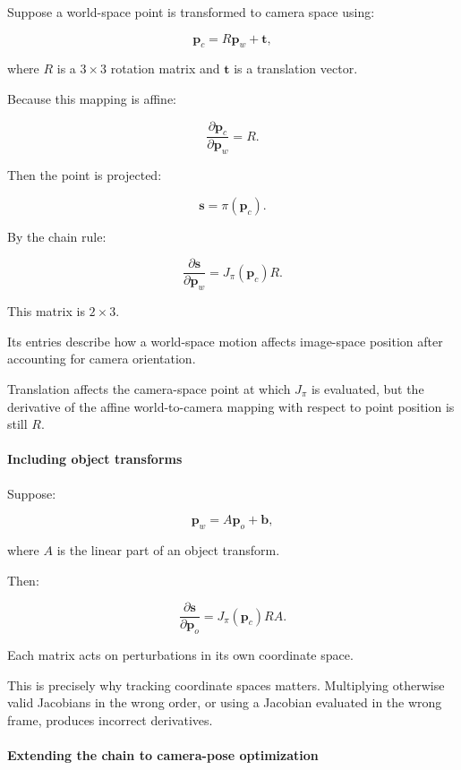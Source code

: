 \hypertarget{02-foundations-ii-ch021-camera-transformation-chain}{}

Suppose a world-space point is transformed to camera space using:

\[
\mathbf p_c=R\mathbf p_w+\mathbf t,
\]

where \(R\) is a \(3\times3\) rotation matrix and \(\mathbf t\) is a translation vector.

Because this mapping is affine:

\[
\frac{\partial\mathbf p_c}{\partial\mathbf p_w}=R.
\]

Then the point is projected:

\[
\mathbf s=\pi(\mathbf p_c).
\]

By the chain rule:

\[
\boxed{ \frac{\partial\mathbf s}{\partial\mathbf p_w} = J_\pi(\mathbf p_c)R }.
\]

This matrix is \(2\times3\).

Its entries describe how a world-space motion affects image-space position after accounting for camera orientation.

Translation affects the camera-space point at which \(J_\pi\) is evaluated, but the derivative of the affine world-to-camera mapping with respect to point position is still \(R\).

\paragraph{Including object transforms}\label{02-foundations-ii-ch021-including-object-transforms}

\hypertarget{02-foundations-ii-ch021-including-object-transforms}{}

Suppose:

\[
\mathbf p_w=A\mathbf p_o+\mathbf b,
\]

where \(A\) is the linear part of an object transform.

Then:

\[
\boxed{ \frac{\partial\mathbf s}{\partial\mathbf p_o} = J_\pi(\mathbf p_c)RA }.
\]

Each matrix acts on perturbations in its own coordinate space.

This is precisely why tracking coordinate spaces matters. Multiplying otherwise valid Jacobians in the wrong order, or using a Jacobian evaluated in the wrong frame, produces incorrect derivatives.

\paragraph{Extending the chain to camera-pose optimization}\label{02-foundations-ii-ch021-extending-the-chain-to-camera-pose-optimization}

